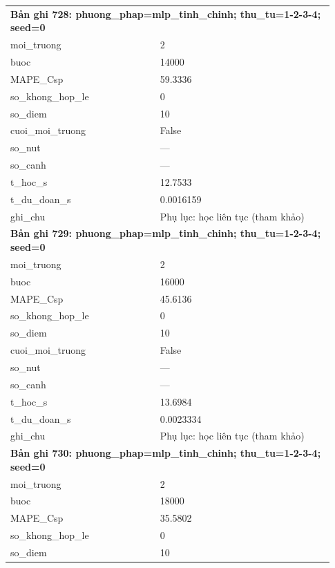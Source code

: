 \begin{longtable}{p{0.43\linewidth}p{0.50\linewidth}}
\midrule
\multicolumn{2}{p{0.95\linewidth}}{\textbf{Bản ghi 728: phuong\_phap=mlp\_tinh\_chinh; thu\_tu=1-2-3-4; seed=0}} \\
moi\_\allowbreak truong & 2 \\
buoc & 14000 \\
MAPE\_\allowbreak Csp & 59.3336 \\
so\_\allowbreak khong\_\allowbreak hop\_\allowbreak le & 0 \\
so\_\allowbreak diem & 10 \\
cuoi\_\allowbreak moi\_\allowbreak truong & False \\
so\_\allowbreak nut & — \\
so\_\allowbreak canh & — \\
t\_\allowbreak hoc\_\allowbreak s & 12.7533 \\
t\_\allowbreak du\_\allowbreak doan\_\allowbreak s & 0.0016159 \\
ghi\_\allowbreak chu & Phụ lục: học liên tục (tham khảo) \\
\midrule
\multicolumn{2}{p{0.95\linewidth}}{\textbf{Bản ghi 729: phuong\_phap=mlp\_tinh\_chinh; thu\_tu=1-2-3-4; seed=0}} \\
moi\_\allowbreak truong & 2 \\
buoc & 16000 \\
MAPE\_\allowbreak Csp & 45.6136 \\
so\_\allowbreak khong\_\allowbreak hop\_\allowbreak le & 0 \\
so\_\allowbreak diem & 10 \\
cuoi\_\allowbreak moi\_\allowbreak truong & False \\
so\_\allowbreak nut & — \\
so\_\allowbreak canh & — \\
t\_\allowbreak hoc\_\allowbreak s & 13.6984 \\
t\_\allowbreak du\_\allowbreak doan\_\allowbreak s & 0.0023334 \\
ghi\_\allowbreak chu & Phụ lục: học liên tục (tham khảo) \\
\midrule
\multicolumn{2}{p{0.95\linewidth}}{\textbf{Bản ghi 730: phuong\_phap=mlp\_tinh\_chinh; thu\_tu=1-2-3-4; seed=0}} \\
moi\_\allowbreak truong & 2 \\
buoc & 18000 \\
MAPE\_\allowbreak Csp & 35.5802 \\
so\_\allowbreak khong\_\allowbreak hop\_\allowbreak le & 0 \\
so\_\allowbreak diem & 10 \\

\end{longtable}
